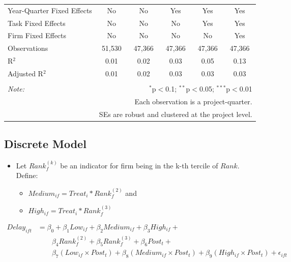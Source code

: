 \documentclass[
]{article}
\providecommand{\tightlist}{%
  \setlength{\itemsep}{0pt}\setlength{\parskip}{0pt}}
\begin{document}
\begin{table}[H]
\begin{tabular}{@{\extracolsep{-2pt}}lccccc}
Year-Quarter Fixed Effects & No & No & Yes & Yes & Yes \\ 
Task Fixed Effects & No & No & No & Yes & Yes \\ 
Firm Fixed Effects & No & No & No & No & Yes \\ 
Observations & 51,530 & 47,366 & 47,366 & 47,366 & 47,366 \\ 
R$^{2}$ & 0.01 & 0.02 & 0.03 & 0.05 & 0.13 \\ 
Adjusted R$^{2}$ & 0.01 & 0.02 & 0.03 & 0.03 & 0.03 \\ 
\hline 
\hline \\[-1.8ex] 
\textit{Note:}  & \multicolumn{5}{r}{$^{*}$p$<$0.1; $^{**}$p$<$0.05; $^{***}$p$<$0.01} \\ 
 & \multicolumn{5}{r}{Each observation is a project-quarter.} \\ 
 & \multicolumn{5}{r}{SEs are robust and clustered at the project level.} \\ 
\end{tabular} 
\end{table}

\hypertarget{discrete-model}{%
\subsection{Discrete Model}\label{discrete-model}}

\begin{itemize}
\tightlist
\item
  Let \(Rank_f^{(k)}\) be an indicator for firm being in the k-th
  tercile of \(Rank\). Define:

  \begin{itemize}
  \tightlist
  \item
    \(Medium_{if}=Treat_i*Rank_f^{(2)}\) and
  \item
    \(High_{if} = Treat_i*Rank_f^{(3)}\)
  \end{itemize}
\end{itemize}

\[\begin{aligned} Delay_{ift} &= \beta_0+\beta_1 Low_{if}+\beta_2 Medium_{if}+\beta_3 High_{if} +\\  & \qquad  \beta_4 Rank_f^{(2)} + \beta_5 Rank_f^{(3)}+ \beta_6 Post_t + \\& \qquad \beta_7 (Low_{if} \times Post_t) + \beta_8 (Medium_{if} \times Post_t) + \beta_9 (High_{if} \times Post_t) + \epsilon_{ift} \end{aligned}\]
\end{document}

